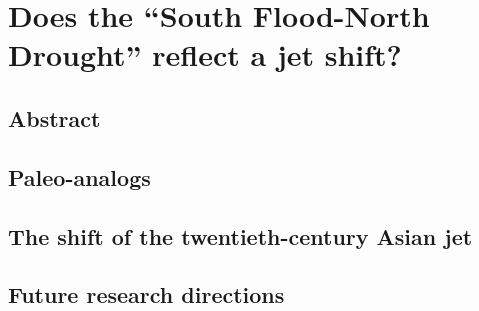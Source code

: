 \chapter{Does the ``South Flood-North Drought'' reflect a jet shift?}

\section{Abstract}

\section{Paleo-analogs}

\section{The shift of the twentieth-century Asian jet}

\section{Future research directions}
